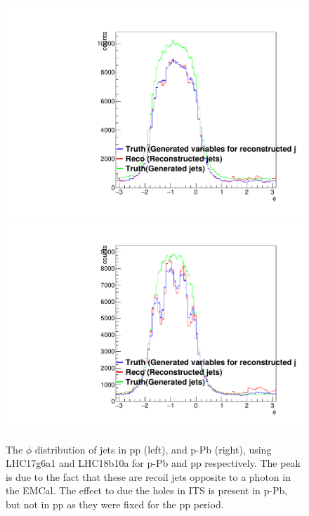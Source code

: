 \begin{figure}[h]
\center
\includegraphics[width=.495\textwidth]{JetResponse/jet_phi_distribution_pp_8GeV.pdf}
\includegraphics[width=.495\textwidth]{JetResponse/jet_phi_distribution_pPb_8GeV.pdf}
\caption{The $\phi$ distribution of jets in pp (left), and p-Pb (right), using LHC17g6a1 and LHC18b10a for p-Pb and pp respectively. The peak is due to the fact that these are recoil jets opposite to a photon in the EMCal. The effect to due the holes in ITS is present in p-Pb, but not in pp as they were fixed for the pp period.}
\label{fig:jetphi}
\end{figure}


